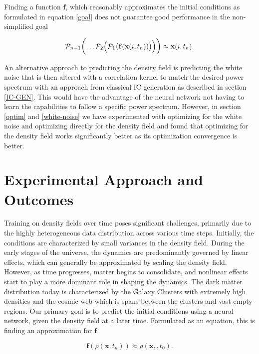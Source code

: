\documentclass{article}
\begin{document}
Finding a function \(\mathbf{f}\), which reasonably approximates the initial conditions as formulated in equation \ref{goal} does not guarantee good performance in the non-simplified goal

\begin{equation}
    \mathcal{P}_{n-1}\biggl( \dots \mathcal{P}_2\Bigl(\mathcal{P}_1\bigl(\mathbf{f}(\mathbf{x}(i, t_{n}))\bigr)\Bigr)\biggr) \approx \mathbf{x}(i, t_{n}).
\end{equation}

An alternative approach to predicting the density field is predicting the white noise that is then altered with a correlation kernel to match the desired power spectrum with an approach from classical IC generation as described in section \ref{IC-GEN}. This would have the advantage of the neural network not having to learn the capabilities to follow a specific power spectrum. However, in section \ref{optim} and \ref{white-noise} we have experimented with optimizing for the white noise and optimizing directly for the density field and found that optimizing for the density field works significantly better as its optimization convergence is better. 

\newpage
\section{Experimental Approach and Outcomes}
Training on density fields over time poses significant challenges, primarily due to the highly heterogeneous data distribution across various time steps. Initially, the conditions are characterized by small variances in the density field. During the early stages of the universe, the dynamics are predominantly governed by linear effects, which can generally be approximated by scaling the density field. However, as time progresses, matter begins to consolidate, and nonlinear effects start to play a more dominant role in shaping the dynamics. The dark matter distribution today is characterized by the Galaxy Clusters with extremely high densities and the cosmic web which is spans between the clusters and vast empty regions. Our primary goal is to predict the initial conditions using a neural network, given the density field at a later time. Formulated as an equation, this is finding an approximation for $\mathbf{f}$

\begin{equation}
    \mathbf{f}(\rho(\mathbf{x}, t_{n})) \approx \rho(\mathbf{x},, t_{0}).
\end{equation}
\end{document}
